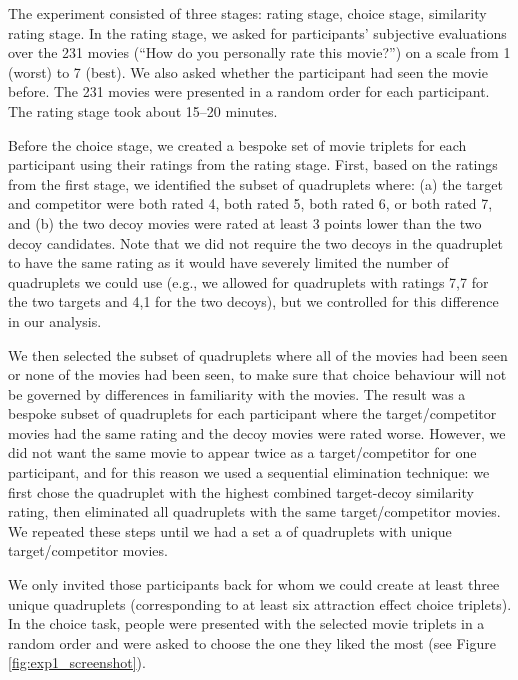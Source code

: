 \documentclass[12pt, a4paper]{article}
\begin{document}
The experiment consisted of three stages: rating stage, choice stage, similarity rating stage. In the rating stage, we asked for participants' subjective evaluations over the 231 movies (``How do you personally rate this movie?'') on a scale from 1 (worst) to 7 (best). We also asked whether the participant had seen the movie before. The 231 movies were presented in a random order for each participant. The rating stage took about 15--20 minutes.

Before the choice stage, we created a bespoke set of movie triplets for each participant using their ratings from the rating stage. First, based on the ratings from the first stage, we identified the subset of quadruplets where: (a) the target and competitor were both rated 4, both rated 5, both rated 6, or both rated 7, and (b) the two decoy movies were rated at least 3 points lower than the two decoy candidates. Note that we did not require the two decoys in the quadruplet to have the same rating as it would have severely limited the number of quadruplets we could use (e.g., we allowed for quadruplets with ratings 7,7 for the two targets and 4,1 for the two decoys), but we controlled for this difference in our analysis.  

We then selected the subset of quadruplets where all of the movies had been seen or none of the movies had been seen, to make sure that choice behaviour will not be governed by differences in familiarity with the movies. The result was a bespoke subset of quadruplets for each participant where the target/competitor movies had the same rating and the decoy movies were rated worse. However, we did not want the same movie to appear twice as a target/competitor for one participant, and for this reason we used a sequential elimination technique: we first chose the quadruplet with the highest combined target-decoy similarity rating, then eliminated all quadruplets with the same target/competitor movies. We repeated these steps until we had a set a of quadruplets with unique target/competitor movies.  
 
We only invited those participants back for whom we could create at least three unique quadruplets (corresponding to at least six attraction effect choice triplets). In the choice task, people were presented with the selected movie triplets in a random order and were asked to choose the one they liked the most (see Figure \ref{fig:exp1_screenshot}). 
 
\end{document}
